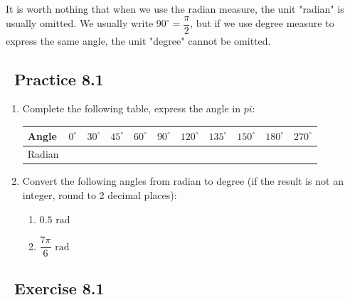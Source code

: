 \documentclass{report}
\begin{document}
It is worth nothing that when we use the radian measure, the unit "radian" is usually omitted. We usually write $90^\circ = \dfrac{\pi}{2}$, but if we use degree measure to express the same angle, the unit "degree" cannot be omitted.

\subsection*{\faFlag\ Practice 8.1 \xrfill[0.175\baselineskip]{1pt}} 

\begin{enumerate}
    \item Complete the following table, express the angle in $pi$:
    
    \begin{tabular}{|l|c|c|c|c|c|c|c|c|c|c|}
        \hline Angle & $0^{\circ}$ & $30^{\circ}$ & $45^{\circ}$ & $60^{\circ}$ & $90^{\circ}$ & $120^{\circ}$ & $135^{\circ}$ & $150^{\circ}$ & $180^{\circ}$ & $270^{\circ}$ \\
        \hline Radian & & & & & & & & & & \\
        \hline
        \end{tabular}

        \item Convert the following angles from radian to degree (if the result is not an integer, round to 2 decimal places):
        \vspace{-1em}
        \begin{multicols}{2}
            \begin{enumerate}[label=(\alph*)]
                \item $0.5 \text{ rad}$
                \item $\dfrac{7\pi}{6} \text{ rad}$
            \end{enumerate}
        \end{multicols}
\end{enumerate}

\subsection*{\faPencil\ Exercise 8.1 \xrfill[0.175\baselineskip]{1pt}}
\end{document}
